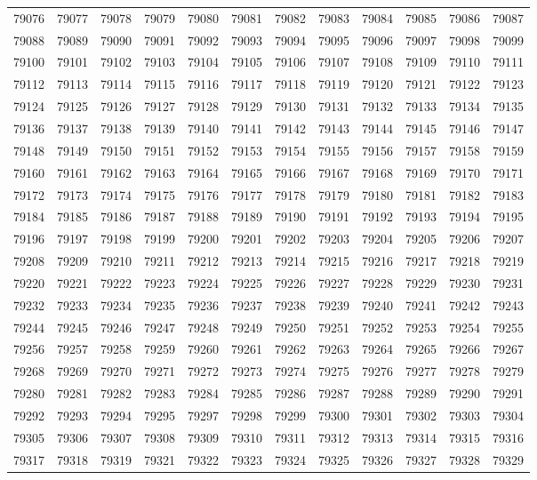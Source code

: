 \begin{center}
\begin{longtable}{llllllllllll}
79076 &79077 &79078 &79079 &79080 &79081 &79082 &79083 &79084 &79085 &79086 &79087 \\
79088 &79089 &79090 &79091 &79092 &79093 &79094 &79095 &79096 &79097 &79098 &79099 \\
79100 &79101 &79102 &79103 &79104 &79105 &79106 &79107 &79108 &79109 &79110 &79111 \\
79112 &79113 &79114 &79115 &79116 &79117 &79118 &79119 &79120 &79121 &79122 &79123 \\
79124 &79125 &79126 &79127 &79128 &79129 &79130 &79131 &79132 &79133 &79134 &79135 \\
79136 &79137 &79138 &79139 &79140 &79141 &79142 &79143 &79144 &79145 &79146 &79147 \\
79148 &79149 &79150 &79151 &79152 &79153 &79154 &79155 &79156 &79157 &79158 &79159 \\
79160 &79161 &79162 &79163 &79164 &79165 &79166 &79167 &79168 &79169 &79170 &79171 \\
79172 &79173 &79174 &79175 &79176 &79177 &79178 &79179 &79180 &79181 &79182 &79183 \\
79184 &79185 &79186 &79187 &79188 &79189 &79190 &79191 &79192 &79193 &79194 &79195 \\
79196 &79197 &79198 &79199 &79200 &79201 &79202 &79203 &79204 &79205 &79206 &79207 \\
79208 &79209 &79210 &79211 &79212 &79213 &79214 &79215 &79216 &79217 &79218 &79219 \\
79220 &79221 &79222 &79223 &79224 &79225 &79226 &79227 &79228 &79229 &79230 &79231 \\
79232 &79233 &79234 &79235 &79236 &79237 &79238 &79239 &79240 &79241 &79242 &79243 \\
79244 &79245 &79246 &79247 &79248 &79249 &79250 &79251 &79252 &79253 &79254 &79255 \\
79256 &79257 &79258 &79259 &79260 &79261 &79262 &79263 &79264 &79265 &79266 &79267 \\
79268 &79269 &79270 &79271 &79272 &79273 &79274 &79275 &79276 &79277 &79278 &79279 \\
79280 &79281 &79282 &79283 &79284 &79285 &79286 &79287 &79288 &79289 &79290 &79291 \\
79292 &79293 &79294 &79295 &79297 &79298 &79299 &79300 &79301 &79302 &79303 &79304 \\
79305 &79306 &79307 &79308 &79309 &79310 &79311 &79312 &79313 &79314 &79315 &79316 \\
79317 &79318 &79319 &79321 &79322 &79323 &79324 &79325 &79326 &79327 &79328 &79329 \\

\end{longtable}
\end{center}
